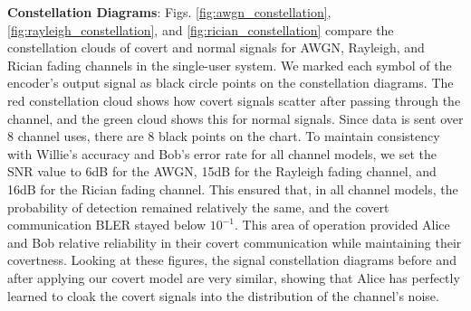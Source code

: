 \textbf{Constellation Diagrams}: Figs. \ref{fig:awgn_constellation}, \ref{fig:rayleigh_constellation}, and \ref{fig:rician_constellation} compare the constellation clouds of covert and normal signals for AWGN, Rayleigh, and Rician fading channels in the single-user system. We marked each symbol of the encoder's output signal as black circle points on the constellation diagrams. The red constellation cloud shows how covert signals scatter after passing through the channel, and the green cloud shows this for normal signals. Since data is sent over 8 channel uses, there are 8 black points on the chart. To maintain consistency with Willie's accuracy and Bob's error rate for all channel models, we set the SNR value to 6dB for the AWGN, 15dB for the Rayleigh fading channel, and 16dB for the Rician fading channel. This ensured that, in all channel models, the probability of detection remained relatively the same, and the covert communication BLER stayed below \(10^{-1}\). This area of operation provided Alice and Bob relative reliability in their covert communication while maintaining their covertness.
Looking at these figures, the signal constellation diagrams before and after applying our covert model are very similar, showing that Alice has perfectly learned to cloak the covert signals into the distribution of the channel's noise.